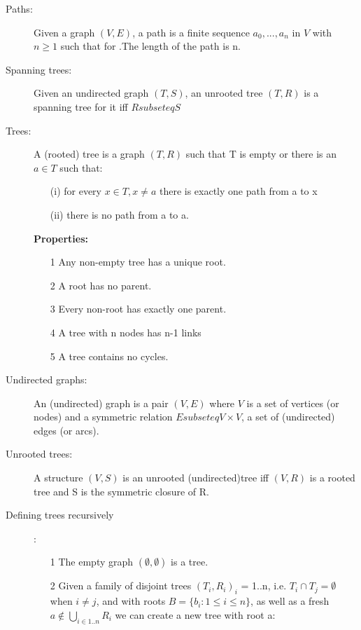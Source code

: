 \documentclass[12pt]{article}
\begin{document}
\begin{description}
\item[Paths:] Given a graph $(V, E)$, a path is a finite sequence $a_0 , ... , a_n$ in $V$ with $n \geq 1$ such that for .The length of the path is n.

\item[Spanning trees:] Given an undirected graph $(T,S)$, an unrooted tree $(T,R)$ is a spanning tree for it iff $R subseteq S$

\item[Trees:] A (rooted) tree is a graph $(T,R)$ such that T is empty or there is an $a \in T$ such that:
\begin{enumerate}
\item[(i)] for every $x \in T, x \neq a$ there is exactly one path from a to x
\item[(ii)] there is no path from a to a. 
\end{enumerate}
\textbf{Properties: }
\begin{enumerate}
\item[1] Any non-empty tree has a unique root.
\item[2] A root has no parent.
\item[3] Every non-root has exactly one parent.
\item[4] A tree with n nodes has n-1 links
\item[5] A tree contains no cycles.
\end{enumerate}

\item[Undirected graphs:] An (undirected) graph is a pair $(V, E)$ where $V$ is a set of vertices (or nodes) and a
symmetric relation $E subseteq V \times V$, a set of (undirected) edges (or arcs).

\item[Unrooted trees:] A structure $(V, S)$ is an unrooted (undirected)tree iff
 $(V, R)$ is a rooted tree and S is the symmetric closure of R.

\item[Defining trees recursively]: \\
\begin{enumerate}
\item[1] The empty graph $(\emptyset , \emptyset)$ is a tree.
\item[2] Given a family of disjoint trees $(T_i , R_i)_i$ = 1..n, i.e. $T_i \cap T_j = \emptyset$ when $i \neq j$,
 and with roots $B = \{b_i : 1 \leq i \leq n\}$, as well as a fresh $a \notin   \bigcup_{i \in 1..n} R_i$ we can
 create a new tree with root a: 
\end{enumerate}
\end{description}
\end{document}
